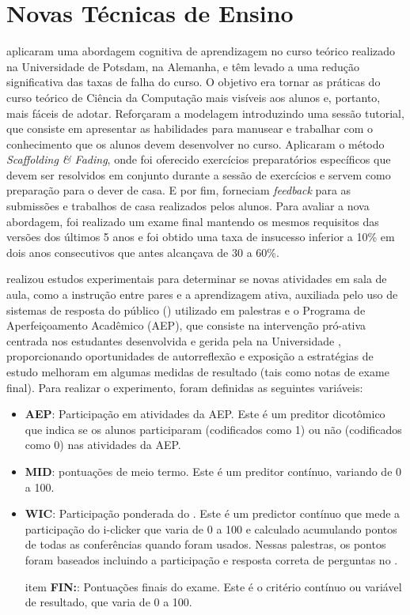 \section{Novas Técnicas de Ensino}

 aplicaram uma abordagem cognitiva de aprendizagem no curso teórico realizado na Universidade de Potsdam, na Alemanha, e têm levado a uma redução significativa das taxas de falha do curso. O objetivo era tornar as práticas do curso teórico de Ciência da Computação mais visíveis aos alunos e, portanto, mais fáceis de adotar. Reforçaram a modelagem introduzindo uma sessão tutorial, que consiste em apresentar as habilidades para manusear e trabalhar com o conhecimento que os alunos devem desenvolver no curso. Aplicaram o método \textit{Scaffolding \& Fading}, onde foi oferecido exercícios preparatórios específicos que devem ser resolvidos em conjunto durante a sessão de exercícios e servem como preparação para o dever de casa. E por fim, forneciam \textit{feedback} para as submissões e trabalhos de casa realizados pelos alunos. Para avaliar a nova abordagem, foi realizado um exame final mantendo os mesmos requisitos das versões dos últimos 5 anos e foi obtido uma taxa de insucesso inferior a 10\% em dois anos consecutivos que antes alcançava de 30 a 60\%.

 realizou estudos experimentais para determinar se novas atividades em sala de aula, como a instrução entre pares e a aprendizagem ativa, auxiliada pelo uso de sistemas de resposta do público () utilizado em palestras e o Programa de Aperfeiçoamento Acadêmico (AEP), que consiste na intervenção pró-ativa centrada nos estudantes desenvolvida e gerida pela  na Universidade , proporcionando oportunidades de autorreflexão e exposição a estratégias de estudo melhoram em algumas medidas de resultado (tais como notas de exame final). Para realizar o experimento, foram definidas as seguintes variáveis:

\begin{itemize}
	\item \textbf{AEP}: Participação em atividades da AEP. Este é um preditor dicotômico que indica se os alunos participaram (codificados como 1) ou não (codificados como 0) nas atividades da AEP.
	
	\item \textbf{MID}: pontuações de meio termo. Este é um preditor contínuo, variando de 0 a 100.
	
	\item \textbf{WIC}: Participação ponderada do . Este é um predictor contínuo que mede a participação do i-clicker que varia de 0 a 100 e calculado acumulando pontos de todas as conferências quando  foram usados. Nessas palestras, os pontos foram baseados incluindo a participação e resposta correta de perguntas no .
	
	item \textbf{FIN:}: Pontuações finais do exame. Este é o critério contínuo ou variável de resultado, que varia de 0 a 100.
\end{itemize}

